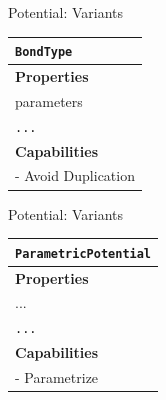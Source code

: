 \documentclass[xcolor=table]{beamer}
\begin{document}
\begin{frame}{Potential: Variants}

\begin{table}[ht]
    \centering
    \begin{tabular}{|l|}
         \hline
         \rowcolor{gray!50}
         \texttt{BondType}  \\
         \hline
         \textbf{Properties}\\
         \hline
         parameters\\
         \texttt{...}\\
         \hline
         \textbf{Capabilities}\\
         \hline
         - Avoid Duplication \\

        \hline
    \end{tabular}
    \label{tab:PotSpec}
\end{table}
\end{frame}

\begin{frame}{Potential: Variants}

\begin{table}[ht]
    \centering
    \begin{tabular}{|l|}
         \hline
         \rowcolor{gray!50}
         \texttt{ParametricPotential}  \\
         \hline

         \textbf{Properties}\\
         \hline
            ...\\
         \texttt{...}\\
         \hline
         \textbf{Capabilities}\\
         \hline
         - Parametrize\\
        \hline
    \end{tabular}
    \label{tab:PotSpec}
\end{table}
\end{frame}
\end{document}
